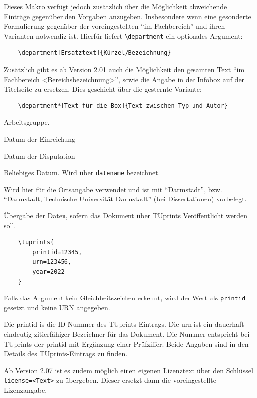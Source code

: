 \documentclass[
	german,%
	accentcolor=9c,%
	ruledheaders=section,%
	class=report,%
	thesis={type=bachelor},%
	fontsize=11pt,%
	parskip=half-,%
	custommargins=true,%
	marginpar=false,%
]{tudapub}
\newcommand*{\code}[1]{\texttt{#1}}
\begin{document}
\begin{description}
	      Dieses Makro verfügt jedoch zusätzlich über die Möglichkeit abweichende Einträge gegenüber den Vorgaben anzugeben. Insbesondere wenn eine gesonderte Formulierung gegenüber der voreingestellten \enquote{im Fachbereich} und ihren Varianten notwendig ist. Hierfür liefert \code{\textbackslash{}department} ein optionales Argument:

\begin{verbatim}
    \department[Ersatztext]{Kürzel/Bezeichnung}
\end{verbatim}
	      Zusätzlich gibt es ab Version 2.01 auch die Möglichkeit den gesamten Text \enquote{im Fachbereich <Bereichsbezeichnung>}, sowie die Angabe in der Infobox auf der Titelseite zu ersetzen. Dies geschieht über die gesternte Variante:
\begin{verbatim}
    \department*[Text für die Box]{Text zwischen Typ und Autor}
\end{verbatim}
	\item[group] Arbeitsgruppe.
	\item[submissiondate] Datum der Einreichung
	\item[examdate] Datum der Disputation
	\item[date] Beliebiges Datum. Wird über \verb|datename| bezeichnet.
	\item[publishers] Wird hier für die Ortsangabe verwendet und ist mit \enquote{Darmstadt}, bzw. \enquote{Darmstadt, Technische Universität Darmstadt} (bei Dissertationen) vorbelegt.
	\item[tuprints] \label{page:tuprints}Übergabe der Daten, sofern das Dokument über TUprints Veröffentlicht werden soll.
\begin{verbatim}
    \tuprints{
        printid=12345,
        urn=123456,
        year=2022
    }
\end{verbatim}
	      Falls das Argument kein Gleichheitszeichen erkennt, wird der Wert als \code{printid} gesetzt und keine URN angegeben.

	      Die printid is die ID-Nummer des TUprints-Eintrags. Die urn ist ein dauerhaft eindeutig zitierfähiger Bezeichner für das Dokument. Die Nummer entspricht bei TUprints der printid mit Ergänzung einer Prüfziffer. Beide Angaben sind in den Details des TUprints-Eintrags zu finden.

	      Ab Version 2.07 ist es zudem möglich einen eigenen Lizenztext über den Schlüssel \verb|license=<Text>| zu übergeben. Dieser ersetzt dann die voreingestellte Lizenzangabe.


\end{description}
\end{document}

